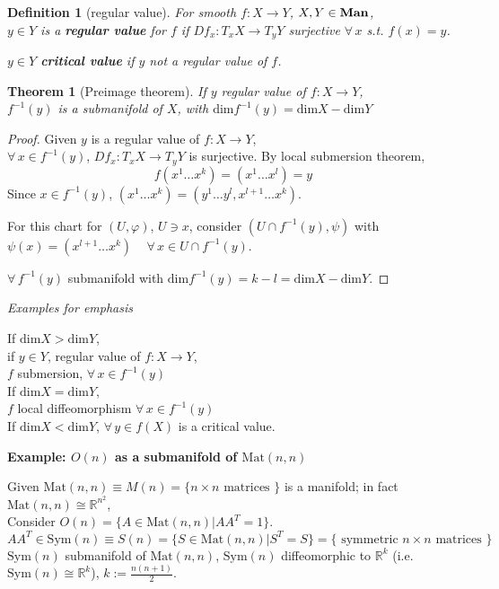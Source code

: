 \documentclass[10pt]{amsart}
\newtheorem{theorem}{Theorem}
\newtheorem{definition}{Definition}
\begin{document}
\begin{multicols*}{2}
\begin{definition}[regular value]
	For smooth $f:X\to Y$, $X,Y \in \text{\textbf{Man}}$, \\
	$y\in Y$ is a \textbf{regular value} for $f$ if $Df_x:T_xX \to T_y Y$ surjective $\forall \, x$ s.t. $f(x)=y$.  
	
	$y\in Y$ \textbf{critical value} if $y$ not a regular value of $f$.  
\end{definition}



\begin{theorem}[Preimage theorem]
If $y$ regular value of $f:X\to Y$, \\
$f^{-1}(y)$ is a submanifold of $X$, with $\text{dim}f^{-1}(y)=\text{dim}X - \text{dim}Y$
\end{theorem}
\begin{proof}
Given $y$ is a regular value of $f:X\to Y$,  \\
$\forall \, x \in f^{-1}(y)$, $Df_x:T_xX \to T_yY$ is surjective.  By local submersion theorem, 
\[
f(x^1 \dots x^k) = (x^1 \dots x^l)=y
\]	
Since $x\in f^{-1}(y)$, $(x^1\dots x^k)=(y^1 \dots y^l,x^{l+1}\dots x^k)$.  

For this chart for $(U,\varphi)$, $U\ni x$, consider $(U\cap f^{-1}(y),\psi)$ with $\psi(x) = (x^{l+1}\dots x^k) \quad \, \forall \, x\in U\cap f^{-1}(y)$.  

$\forall \, f^{-1}(y)$ submanifold with $\text{dim}f^{-1}(y) = k-l = \text{dim}X-\text{dim}Y$.  
	\end{proof}

\emph{Examples for emphasis}

If $\text{dim}X > \text{dim}Y$, \\
\phantom{\qquad \, } if $y\in Y$, regular value of $f:X\to Y$, \\
\phantom{\qquad \, \qquad \, } $f$ submersion, $\forall \, x \in f^{-1}(y)$ \\
If $\text{dim}X = \text{dim}Y$, \\
\phantom{\qquad \, } $f$ local diffeomorphism $\forall \, x\in f^{-1}(y)$ \\
If $\text{dim}X < \text{dim}Y$, $\forall \, y\in f(X)$ is a critical value.  


\textbf{Example: $O(n)$ as a submanifold of $\text{Mat}(n,n)$}

Given $\text{Mat}(n,n)\equiv M(n) = \lbrace n \times n \text{ matrices } \rbrace$ is a manifold; in fact $\text{Mat}(n,n) \cong \mathbb{R}^{n^2}$, \\
Consider $O(n) = \lbrace A \in \text{Mat}(n,n) | AA^T = 1\rbrace$.  
\begin{equation}
AA^T \in \text{Sym}(n) \equiv S(n) = \lbrace S\in \text{Mat}(n,n) | S^T = S \rbrace = \lbrace \text{ symmetric $n\times n$ matrices } \rbrace
\end{equation}
$\text{Sym}(n)$ submanifold of $\text{Mat}(n,n)$, $\text{Sym}(n)$ diffeomorphic to $\mathbb{R}^k$ (i.e. $\text{Sym}(n) \cong \mathbb{R}^k$), $k:= \frac{n (n+1)}{2}$.  


\end{multicols*}
\end{document}
